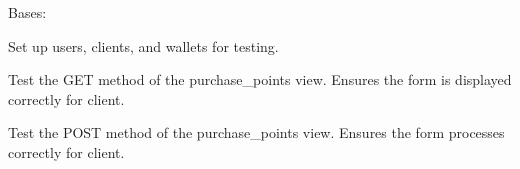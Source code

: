 \documentclass[letterpaper,10pt,english]{sphinxmanual}
\begin{document}
\begin{fulllineitems}
\label{\detokenize{modules/tests:finances.tests.FinancesTests}}
\pysigstartsignatures
{}
\pysigstopsignatures
\sphinxAtStartPar
Bases: 

\begin{fulllineitems}
\label{\detokenize{modules/tests:finances.tests.FinancesTests.setUp}}
\pysigstartsignatures
{}
\pysigstopsignatures
\sphinxAtStartPar
Set up users, clients, and wallets for testing.

\end{fulllineitems}


\begin{fulllineitems}
\label{\detokenize{modules/tests:finances.tests.FinancesTests.test_purchase_points_view_get}}
\pysigstartsignatures
{}
\pysigstopsignatures
\sphinxAtStartPar
Test the GET method of the purchase\_points view. Ensures the form is displayed correctly for client.

\end{fulllineitems}


\begin{fulllineitems}
\label{\detokenize{modules/tests:finances.tests.FinancesTests.test_purchase_points_view_post}}
\pysigstartsignatures
{}
\pysigstopsignatures
\sphinxAtStartPar
Test the POST method of the purchase\_points view. Ensures the form processes correctly for client.


\end{fulllineitems}
\end{fulllineitems}
\end{document}
